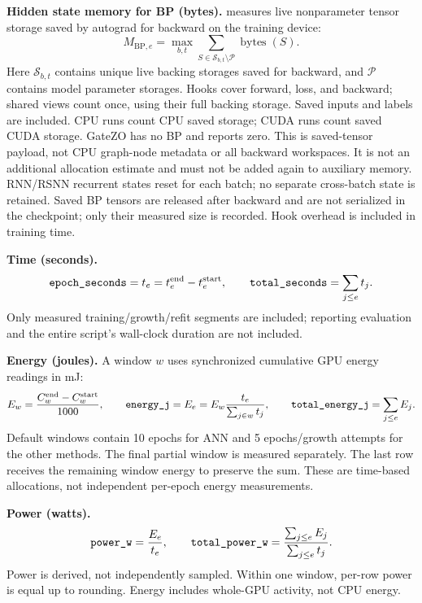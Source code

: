\documentclass[a4paper,10pt]{article}
\newcommand{\metric}[1]{\texttt{\detokenize{#1}}}
\begin{document}
\textbf{Hidden state memory for BP (bytes).}
\metric{hiddenstatememfor bp} measures live nonparameter tensor storage saved
by autograd for backward on the training device:
\[
 M_{\mathrm{BP},e}=\max_{b,t}\sum_{S\in\mathcal S_{b,t}\setminus\mathcal P}
 \operatorname{bytes}(S).
\]
Here $\mathcal S_{b,t}$ contains unique live backing storages saved for backward,
and $\mathcal P$ contains model parameter storages. Hooks cover forward, loss,
and backward; shared views count once, using their full backing storage.
Saved inputs and labels are included. CPU runs count CPU saved storage;
CUDA runs count saved CUDA storage. GateZO has no BP and reports zero.
This is saved-tensor payload, not CPU graph-node metadata or all backward
workspaces. It is not an additional allocation estimate and must not be added
again to auxiliary memory. RNN/RSNN recurrent states reset for each batch;
no separate cross-batch state is retained. Saved BP tensors are released after
backward and are not serialized in the checkpoint; only their measured size
is recorded. Hook overhead is included in training time.

\textbf{Time (seconds).}
\[
 \text{\metric{epoch_seconds}}=t_e=t_e^{\mathrm{end}}-t_e^{\mathrm{start}},
 \qquad
 \text{\metric{total_seconds}}=\sum_{j\le e}t_j.
\]
Only measured training/growth/refit segments are included; reporting evaluation
and the entire script's wall-clock duration are not included.

\textbf{Energy (joules).}
A window $w$ uses synchronized cumulative GPU energy readings in mJ:
\[
 E_w=\frac{C_w^{\mathrm{end}}-C_w^{\mathrm{start}}}{1000},\qquad
 \text{\metric{energy_j}}=E_e=E_w\frac{t_e}{\sum_{j\in w}t_j},\qquad
 \text{\metric{total_energy_j}}=\sum_{j\le e}E_j.
\]
Default windows contain 10 epochs for ANN and 5 epochs/growth attempts for the
other methods. The final partial window is measured separately. The last row
receives the remaining window energy to preserve the sum. These are time-based
allocations, not independent per-epoch energy measurements.

\textbf{Power (watts).}
\[
 \text{\metric{power_w}}=\frac{E_e}{t_e},\qquad
 \text{\metric{total_power_w}}=\frac{\sum_{j\le e}E_j}{\sum_{j\le e}t_j}.
\]
Power is derived, not independently sampled. Within one window, per-row power
is equal up to rounding. Energy includes whole-GPU activity, not CPU energy.
\end{document}
